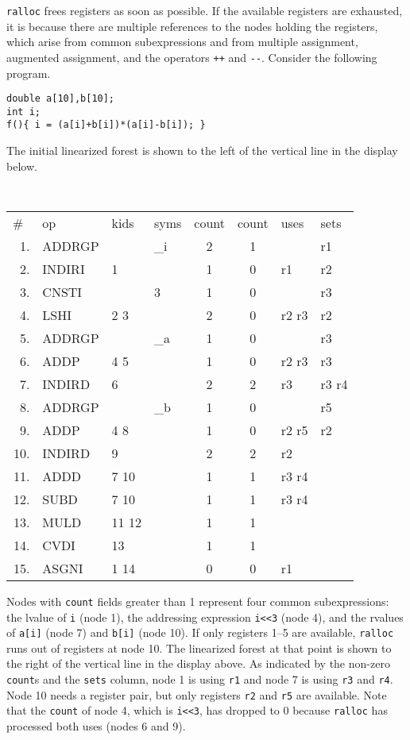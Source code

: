 \verb|ralloc| frees registers as soon as possible.
If the available registers are exhausted,
it is because there are multiple references
to the nodes holding the registers, which arise
from common subexpressions and from multiple assignment, augmented
assignment, and the operators \verb|++| and \verb|--|.
Consider the following program.
\begin{verbatim}
double a[10],b[10];
int i;
f(){ i = (a[i]+b[i])*(a[i]-b[i]); }
\end{verbatim}
The initial linearized forest is shown to the left of
the vertical line in the display below.
\begin{flushleft}\tt
\begin{tabular}{rlllc|cll}
\#\ & op      & kids    & syms  & count &count   & uses   & sets  \\
 1. & ADDRGP  &         & \_i   &   2   &   1    &        & r1    \\
 2. & INDIRI  &  1      &       &   1   &   0    & r1     & r2    \\
 3. & CNSTI   &         & 3     &   1   &   0    &        & r3    \\
 4. & LSHI    &  2  3   &       &   2   &   0    & r2 r3  & r2    \\
 5. & ADDRGP  &         & \_a   &   1   &   0    &        & r3    \\
 6. & ADDP    &  4  5   &       &   1   &   0    & r2 r3  & r3    \\
 7. & INDIRD  &  6      &       &   2   &   2    & r3     & r3 r4 \\
 8. & ADDRGP  &         & \_b   &   1   &   0    &        & r5    \\
 9. & ADDP    &  4  8   &       &   1   &   0    & r2 r5  & r2    \\
10. & INDIRD  &  9      &       &   2   &   2    & r2    \\
11. & ADDD    &  7 10   &       &   1   &   1    & r3 r4 \\
12. & SUBD    &  7 10   &       &   1   &   1    & r3 r4 \\
13. & MULD    & 11 12   &       &   1   &   1 \\
14. & CVDI    & 13      &       &   1   &   1 \\
15. & ASGNI   &  1 14   &       &   0   &   0    & r1 \\
\end{tabular}
\end{flushleft}
Nodes with \verb|count| fields greater than 1 represent
four common subexpressions: the lvalue of \verb|i| (node 1),
the addressing expression \verb|i<<3| (node 4), and
the rvalues of \verb|a[i]| (node 7) and \verb|b[i]| (node 10).
If only registers 1--5 are available, \verb|ralloc| runs
out of registers at node 10.
The linearized forest at that point is shown to the right of
the vertical line in the display above.
As indicated by the non-zero \verb|count|s and the \verb|sets| column,
node 1 is using \verb|r1| and
node 7 is using \verb|r3| and \verb|r4|.
Node 10 needs a register pair,
but only registers \verb|r2| and \verb|r5| are available.
Note that the \verb|count| of node 4, which is \verb|i<<3|,
has dropped to 0 because \verb|ralloc| has
processed both uses (nodes 6 and 9).

